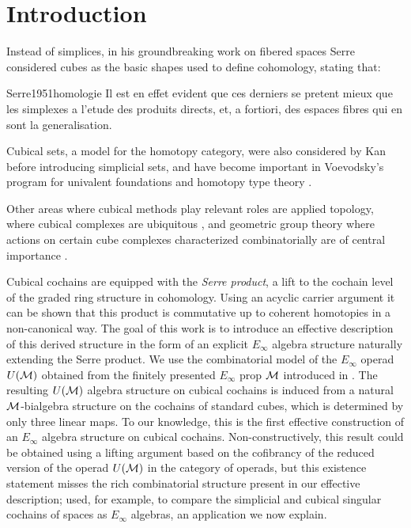 
\section{Introduction} \label{s:introduction}

Instead of simplices, in his groundbreaking work on fibered spaces Serre considered cubes as the basic shapes used to define cohomology, stating that:

\begin{displaycquote}[p.431]{Serre1951homologie}
	Il est en effet evident que ces derniers se pretent mieux que les simplexes a l'etude des produits directs, et, a fortiori, des espaces fibres qui en sont la generalisation.
\end{displaycquote}

Cubical sets, a model for the homotopy category, were also considered by Kan \cite{kan1955abstract, kan1956abstract} before introducing simplicial sets, and have become important in Voevodsky's program for univalent foundations and homotopy type theory \cite{kapulkin2020straightening, mortberg2019cubical}.

Other areas where cubical methods play relevant roles are applied topology, where cubical complexes are ubiquitous \cite{tomasz2004computational}, and geometric group theory where actions on certain cube complexes characterized combinatorially are of central importance \cite{gromov1987hyperbolic, agol2013haken}.

Cubical cochains are equipped with the \textit{Serre product}, a lift to the cochain level of the graded ring structure in cohomology.
Using an acyclic carrier argument it can be shown that this product is commutative up to coherent homotopies in a non-canonical way.
The goal of this work is to introduce an effective description of this derived structure in the form of an explicit $E_\infty$ algebra structure naturally extending the Serre product.
We use the combinatorial model of the $E_\infty$ operad $U(\mathcal{M})$ obtained from the finitely presented $E_\infty$ prop $\mathcal{M}$ introduced in \cite{medina2020prop1}.
The resulting $U(\mathcal{M})$ algebra structure on cubical cochains is induced from a natural $\mathcal{M}$-bialgebra structure on the cochains of standard cubes, which is determined by only three linear maps.
To our knowledge, this is the first effective construction of an $E_\infty$ algebra structure on cubical cochains.
Non-constructively, this result could be obtained using a lifting argument based on the cofibrancy of the reduced version of the operad $U(\mathcal{M})$ in the category of operads, but this existence statement misses the rich combinatorial structure present in our effective description; used, for example, to compare the simplicial and cubical singular cochains of spaces as $E_\infty$ algebras, an application we now explain.

